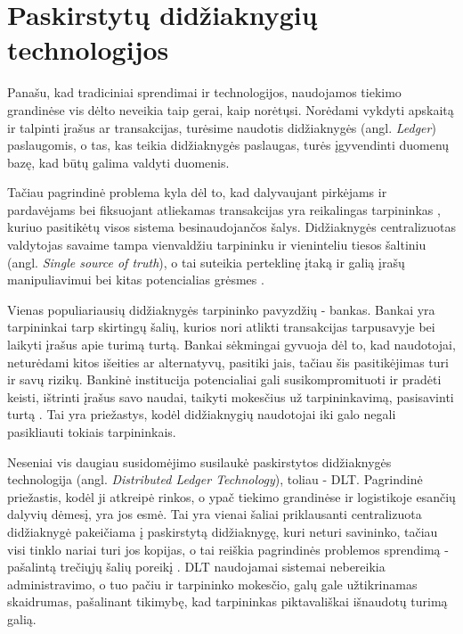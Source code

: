 \section {Paskirstytų didžiaknygių technologijos}

Panašu, kad tradiciniai sprendimai ir technologijos, naudojamos tiekimo grandinėse vis dėlto neveikia taip gerai, kaip norėtųsi.
Norėdami vykdyti apskaitą ir talpinti įrašus ar transakcijas, turėsime naudotis didžiaknygės (angl. \textit{Ledger}) paslaugomis, o tas, kas teikia didžiaknygės paslaugas, turės įgyvendinti duomenų bazę, kad būtų galima valdyti duomenis.

Tačiau pagrindinė problema kyla dėl to, kad dalyvaujant pirkėjams ir pardavėjams bei fiksuojant atliekamas transakcijas yra reikalingas tarpininkas \cite{gao2018coc}, kuriuo pasitikėtų visos sistema besinaudojančos šalys. Didžiaknygės centralizuotas valdytojas savaime tampa vienvaldžiu tarpininku ir vieninteliu tiesos šaltiniu (angl. \textit{Single source of truth}), o tai suteikia perteklinę įtaką ir galią įrašų manipuliavimui bei kitas potencialias grėsmes \cite{jiang2017much} \cite{shyamasundar2018blockchain}. 

Vienas populiariausių didžiaknygės tarpininko pavyzdžių - bankas. Bankai yra tarpininkai tarp skirtingų šalių, kurios nori atlikti transakcijas tarpusavyje bei laikyti įrašus apie turimą turtą. Bankai sėkmingai gyvuoja dėl to, kad naudotojai, neturėdami kitos išeities ar alternatyvų, pasitiki jais, tačiau šis pasitikėjimas turi ir savų rizikų. Bankinė institucija potencialiai gali susikompromituoti ir pradėti keisti, ištrinti įrašus savo naudai, taikyti mokesčius už tarpininkavimą, pasisavinti turtą \cite{shyamasundar2018blockchain}. Tai yra priežastys, kodėl didžiaknygių naudotojai iki galo negali pasikliauti tokiais tarpininkais.

Neseniai vis daugiau susidomėjimo susilaukė paskirstytos didžiaknygės technologija (angl. \textit{Distributed Ledger Technology}), toliau - DLT. Pagrindinė priežastis, kodėl ji atkreipė rinkos, o ypač tiekimo grandinėse ir logistikoje esančių dalyvių dėmesį, yra jos esmė. Tai yra vienai šaliai priklausanti centralizuota didžiaknygė pakeičiama į paskirstytą didžiaknygę, kuri neturi savininko, tačiau visi tinklo nariai turi jos kopijas, o tai reiškia pagrindinės problemos sprendimą - pašalintą trečiųjų šalių poreikį \cite{shyamasundar2018blockchain}. DLT naudojamai sistemai nebereikia administravimo, o tuo pačiu ir tarpininko mokesčio, galų gale užtikrinamas skaidrumas, pašalinant tikimybę, kad tarpininkas piktavališkai išnaudotų turimą galią.

